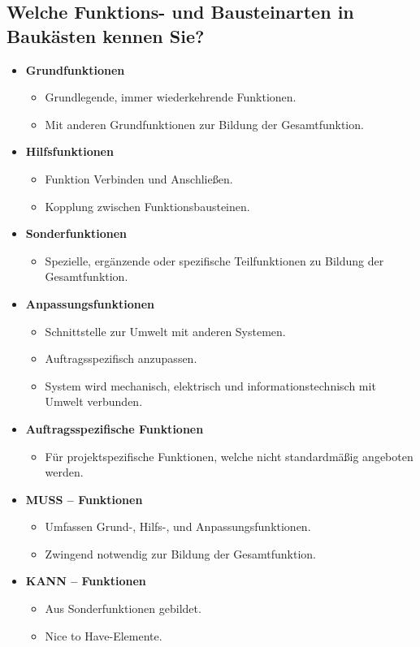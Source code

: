 \subsection{Welche Funktions- und Bausteinarten in Baukästen kennen Sie?}

\begin{itemize}
    \item \textbf{Grundfunktionen}
        \begin{itemize}
            \item Grundlegende, immer wiederkehrende Funktionen.
            \item Mit anderen Grundfunktionen zur Bildung der Gesamtfunktion.
        \end{itemize}
    \item \textbf{Hilfsfunktionen}
        \begin{itemize}
            \item Funktion Verbinden und Anschließen.
            \item Kopplung zwischen Funktionsbausteinen. 
        \end{itemize}
    \item \textbf{Sonderfunktionen}
        \begin{itemize}
            \item Spezielle, ergänzende oder spezifische Teilfunktionen zu Bildung der Gesamtfunktion.
        \end{itemize}
    \item \textbf{Anpassungsfunktionen}
        \begin{itemize}
            \item Schnittstelle zur Umwelt mit anderen Systemen. 
            \item Auftragsspezifisch anzupassen.
            \item System wird mechanisch, elektrisch und informationstechnisch mit Umwelt verbunden.
        \end{itemize}
    \item \textbf{Auftragsspezifische Funktionen}
        \begin{itemize}
            \item Für projektspezifische Funktionen, welche nicht standardmäßig angeboten werden.
        \end{itemize}
    \item \textbf{MUSS – Funktionen}
        \begin{itemize}
            \item Umfassen Grund-, Hilfs-, und Anpassungsfunktionen. 
            \item Zwingend notwendig zur Bildung der Gesamtfunktion. 
        \end{itemize}
    \item \textbf{KANN – Funktionen}
        \begin{itemize}
            \item Aus Sonderfunktionen gebildet.
            \item Nice to Have-Elemente.
        \end{itemize}
\end{itemize}


